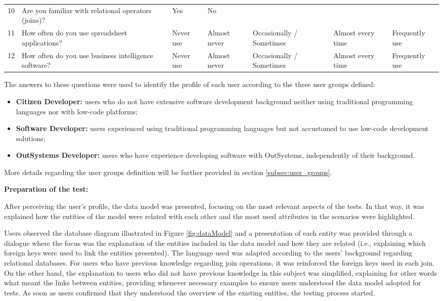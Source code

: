 \begin{table}[tb]
\begin{tabular}{@{}lm{4cm}C{1.3cm}C{1.3cm}C{2cm}C{1.3cm}C{1.4cm}@{}}
    10 & Are you familiar with relational operators (joins)?             & Yes           & No                    &                                                 \\
    11 & How often do you use spreadsheet applications?                  & Never use     & Almost never          & Occasionally / Sometimes & Almost every time & Frequently use       \\
    12 & How often do you use business intelligence software?            & Never use     & Almost never          & Occasionally / Sometimes & Almost every time & Frequently use      
    \end{tabular}
    \end{table}

The answers to these questions were used to identify the profile of each user according to the three user groups defined:

\begin{itemize}
    \item \textbf{Citizen Developer: } users who do not have extensive software development background neither using traditional programming languages nor with low-code platforms;
    \item \textbf{Software Developer: } users experienced using traditional programming languages but not accustomed to use low-code development solutions;
    \item \textbf{OutSystems Developer: } users who have experience developing software with OutSystems, independently of their background.
\end{itemize}

More details regarding the user groups definition will be further provided in section \ref{subsec:user_groups}.

\medskip
\textbf{Preparation of the test:}
\medskip

After perceiving the user's profile, the data model was presented, focusing on the most relevant aspects of the tests. In that way, it was explained how the entities of the model were related with each other and the most used attributes in the scenarios were highlighted. 

Users observed the database diagram illustrated in Figure \ref{fig:dataModel} and a presentation of each entity was provided through a dialogue where the focus was the explanation of the entities included in the data model and how they are related (i.e., explaining which foreign keys were used to link the entities presented). The language used was adapted according to the users' background regarding relational databases. For users who have previous knowledge regarding join operations, it was reinforced the foreign keys used in each join. On the other hand, the explanation to users who did not have previous knowledge in this subject was simplified, explaining for other words what meant the links between entities, providing whenever necessary examples to ensure users understood the data model adopted for tests. As soon as users confirmed that they understood the overview of the existing entities, the testing process started. 

